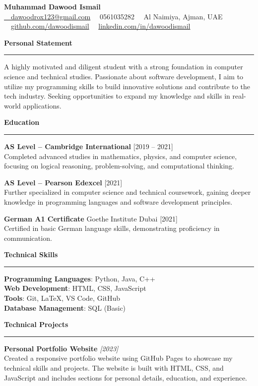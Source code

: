\documentclass[a4paper,10pt]{article}
\newcommand{\CVSection}[1]{%
    \vspace{12pt}
    \textcolor{sectioncolor}{\Large\textbf{#1}} \\
    \rule{\textwidth}{0.5mm}
}
\begin{document}
\begin{center}
    {\Huge \textbf{Muhammad Dawood Ismail}} \\
    \vspace{4pt}
    \href{mailto:dawoodrox123@gmail.com}{\faEnvelope\ \ dawoodrox123@gmail.com} \hspace{10pt}
    \faPhone\ \ 0561035282 \hspace{10pt}
    \faMapMarker\ \ Al Naimiya, Ajman, UAE \\
    \faGithub\ \ \href{https://github.com/yourusername}{github.com/dawoodismail} \hspace{10pt}
    \faLinkedin\ \ \href{https://www.linkedin.com/in/yourprofile}{linkedin.com/in/dawoodismail}
\end{center}

\CVSection{Personal Statement}
A highly motivated and diligent student with a strong foundation in computer science and technical studies. Passionate about software development, I aim to utilize my programming skills to build innovative solutions and contribute to the tech industry. Seeking opportunities to expand my knowledge and skills in real-world applications.

\CVSection{Education}
\textbf{AS Level – Cambridge International} \hfill [2019 – 2021] \\
Completed advanced studies in mathematics, physics, and computer science, focusing on logical reasoning, problem-solving, and computational thinking.

\textbf{AS Level – Pearson Edexcel} \hfill [2021] \\
Further specialized in computer science and technical coursework, gaining deeper knowledge in programming languages and software development principles.

\textbf{German A1 Certificate} \hfill Goethe Institute Dubai [2021] \\
Certified in basic German language skills, demonstrating proficiency in communication.

\CVSection{Technical Skills}
\textbf{Programming Languages}: Python, Java, C++ \\
\textbf{Web Development}: HTML, CSS, JavaScript \\
\textbf{Tools}: Git, LaTeX, VS Code, GitHub \\
\textbf{Database Management}: SQL (Basic)

\CVSection{Technical Projects}
\textbf{Personal Portfolio Website} \hfill \textit{[2023]} \\
Created a responsive portfolio website using GitHub Pages to showcase my technical skills and projects. The website is built with HTML, CSS, and JavaScript and includes sections for personal details, education, and experience.
\end{document}
